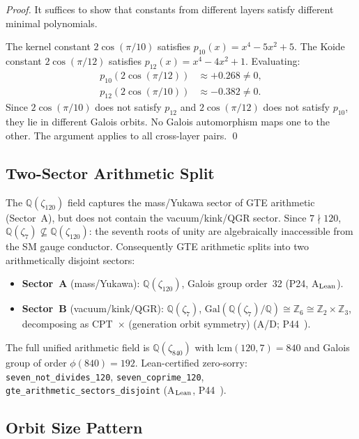\documentclass[11pt]{article}
\theoremstyle{remark}
\begin{document}
\begin{proof}
It suffices to show that constants from different layers satisfy different minimal
polynomials.

The kernel constant $2\cos(\pi/10)$ satisfies $p_{10}(x) = x^4 - 5x^2 + 5$.
The Koide constant $2\cos(\pi/12)$ satisfies $p_{12}(x) = x^4 - 4x^2 + 1$.
Evaluating:
\begin{align*}
  p_{10}(2\cos(\pi/12)) &\approx +0.268 \neq 0, \\
  p_{12}(2\cos(\pi/10)) &\approx -0.382 \neq 0.
\end{align*}
Since $2\cos(\pi/10)$ does not satisfy $p_{12}$ and $2\cos(\pi/12)$ does not satisfy
$p_{10}$, they lie in different Galois orbits.
No Galois automorphism maps one to the other.
The argument applies to all cross-layer pairs.
\qed
\end{proof}

\subsection{Two-Sector Arithmetic Split}
\label{ssec:two_sector_arithmetic}

The $\mathbb{Q}(\zeta_{120})$ field captures the mass/Yukawa sector of GTE arithmetic
(Sector~A), but does not contain the vacuum/kink/QGR sector.  Since $7 \nmid 120$,
$\mathbb{Q}(\zeta_7) \not\subseteq \mathbb{Q}(\zeta_{120})$: the seventh roots of
unity are algebraically inaccessible from the SM gauge conductor.  Consequently GTE
arithmetic splits into two arithmetically disjoint sectors:
\begin{itemize}[noitemsep]
\item \textbf{Sector~A} (mass/Yukawa): $\mathbb{Q}(\zeta_{120})$, Galois group
  order~32 (P24, A$_{\rm Lean}$).
\item \textbf{Sector~B} (vacuum/kink/QGR): $\mathbb{Q}(\zeta_7)$,
  $\mathrm{Gal}(\mathbb{Q}(\zeta_7)/\mathbb{Q}) \cong \mathbb{Z}_6 \cong \mathbb{Z}_2 \times \mathbb{Z}_3$,
  decomposing as CPT~$\times$ (generation orbit symmetry) (A/D; P44~\cite{SpivackQGR}).
\end{itemize}
The full unified arithmetic field is $\mathbb{Q}(\zeta_{840})$ with
$\mathrm{lcm}(120, 7) = 840$ and Galois group of order $\phi(840) = 192$.
Lean-certified zero-sorry: \texttt{seven\_not\_divides\_120},
\texttt{seven\_coprime\_120}, \texttt{gte\_arithmetic\_sectors\_disjoint}
(A$_{\rm Lean}$, P44~\cite{SpivackQGR}).

\subsection{Orbit Size Pattern}
\end{document}
